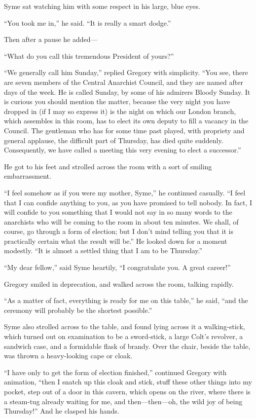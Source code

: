 Syme sat watching him with some respect in his large, blue eyes.

“You took me in,” he said. “It is really a smart dodge.”

Then after a pause he added⁠—

“What do you call this tremendous President of yours?”

“We generally call him Sunday,” replied Gregory with simplicity. “You see, there are seven members of the Central Anarchist Council, and they are named after days of the week. He is called Sunday, by some of his admirers Bloody Sunday. It is curious you should mention the matter, because the very night you have dropped in (if I may so express it) is the night on which our London branch, which assembles in this room, has to elect its own deputy to fill a vacancy in the Council. The gentleman who has for some time past played, with propriety and general applause, the difficult part of Thursday, has died quite suddenly. Consequently, we have called a meeting this very evening to elect a successor.”

He got to his feet and strolled across the room with a sort of smiling embarrassment.

“I feel somehow as if you were my mother, Syme,” he continued casually. “I feel that I can confide anything to you, as you have promised to tell nobody. In fact, I will confide to you something that I would not say in so many words to the anarchists who will be coming to the room in about ten minutes. We shall, of course, go through a form of election; but I don’t mind telling you that it is practically certain what the result will be.” He looked down for a moment modestly. “It is almost a settled thing that I am to be Thursday.”

“My dear fellow,” said Syme heartily, “I congratulate you. A great career!”

Gregory smiled in deprecation, and walked across the room, talking rapidly.

“As a matter of fact, everything is ready for me on this table,” he said, “and the ceremony will probably be the shortest possible.”

Syme also strolled across to the table, and found lying across it a walking-stick, which turned out on examination to be a sword-stick, a large Colt’s revolver, a sandwich case, and a formidable flask of brandy. Over the chair, beside the table, was thrown a heavy-looking cape or cloak.

“I have only to get the form of election finished,” continued Gregory with animation, “then I snatch up this cloak and stick, stuff these other things into my pocket, step out of a door in this cavern, which opens on the river, where there is a steam-tug already waiting for me, and then⁠—then⁠—oh, the wild joy of being Thursday!” And he clasped his hands.

